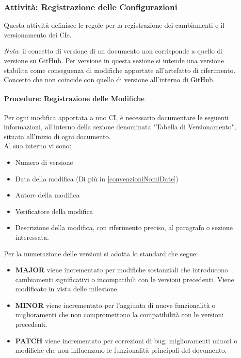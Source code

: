 \documentclass[a4paper,12pt]{article}
\begin{document}
\subsubsection{Attività: Registrazione delle Configurazioni} \label{versionamento_identificazione}
Questa attività definisce le regole per la registrazione dei cambiamenti e il versionamento dei CIs.

\textit{Nota}: il concetto di versione di un documento non corrisponde a quello di versione su GitHub.
Per versione in questa sezione si intende una versione stabilita come conseguenza di modifiche apportate all'artefatto di riferimento. Concetto che non coincide con quello di versione all'interno di GitHub.

\paragraph{Procedure: Registrazione delle Modifiche}\label{versione}
Per ogni modifica apportata a uno CI, è necessario documentare le seguenti informazioni, all'interno della sezione denominata "Tabella di Versionamento", situata all'inizio di ogni documento.\\Al suo interno vi sono:
\begin{itemize}
    \item Numero di versione
    \item Data della modifica (Di più in \ref{convenzioniNomiDate})
    \item Autore della modifica
    \item Verificatore della modifica
    \item Descrizione della modifica, con riferimento preciso, al paragrafo o sezione interessata.
\end{itemize}
Per la numerazione delle versioni si adotta lo standard che segue:
\begin{itemize}
    \item \textbf{MAJOR} viene incrementato per modifiche sostanziali che introducono cambiamenti significativi o incompatibili con le versioni precedenti. Viene modificato in vista delle milestone.
    \item \textbf{MINOR} viene incrementato per l'aggiunta di nuove funzionalità o miglioramenti che non compromettono la compatibilità con le versioni precedenti.
    \item \textbf{PATCH} viene incrementato per correzioni di bug, miglioramenti minori o modifiche che non influenzano le funzionalità principali del documento.
\end{itemize}
\end{document}
